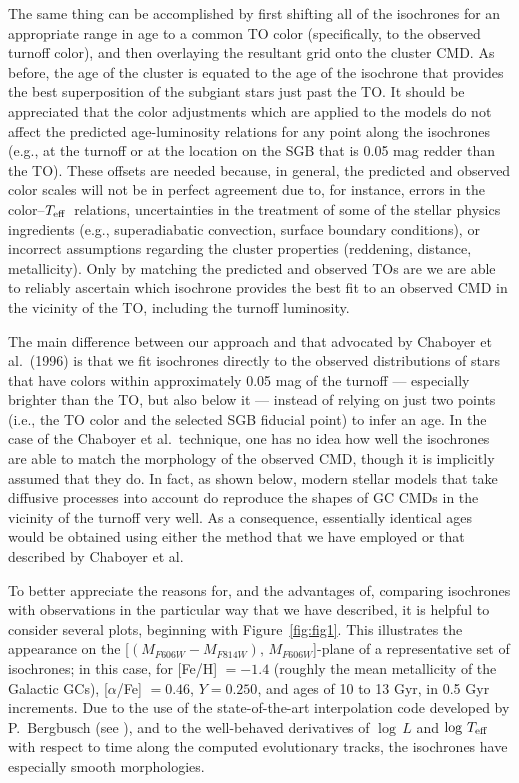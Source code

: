 \documentclass[12pt,preprint]{aastex}
\newcommand\teff{{T_{\rm eff}}}
\begin{document}
The same thing can be accomplished by first shifting all of the isochrones for
an appropriate range in age to a common TO color (specifically, to the observed
turnoff color), and then overlaying the resultant grid onto the cluster CMD.
As before, the age of the cluster is equated to the age of the isochrone that
provides the best superposition of the subgiant stars just past the TO.   It
should be appreciated that the color adjustments which are applied to the models
do not affect the predicted age-luminosity relations for any point along the
isochrones (e.g., at the turnoff or at the location on the SGB that is 0.05 mag
redder than the TO).  These offsets are needed because, in general, the 
predicted and observed color scales will not be in perfect agreement due to,
for instance, errors in the color--$\teff$\ relations, uncertainties in the
treatment of some of the stellar physics ingredients (e.g., superadiabatic
convection, surface boundary conditions), or incorrect assumptions regarding
the cluster properties (reddening, distance, metallicity).  Only by matching the
predicted and observed TOs are we are able to reliably ascertain which isochrone
provides the best fit to an observed CMD in the vicinity of the TO, including
the turnoff luminosity.

The main difference between our approach and that advocated by Chaboyer et
al.~(1996) is that we fit isochrones directly to the observed distributions of
stars that have colors within approximately 0.05 mag of the turnoff ---
especially brighter than the TO, but also below it --- instead of relying on
just two points (i.e., the TO color and the selected SGB fiducial point) to 
infer an age.  In the case of the Chaboyer et al.~technique, one has no idea
how well the isochrones are able to match the morphology of the observed CMD,
though it is implicitly assumed that they do.  In fact, as shown below, modern
stellar models that take diffusive processes into account do reproduce the
shapes of GC CMDs in the vicinity of the turnoff very well.  As a consequence,
essentially identical ages would be obtained using either the method that we
have employed or that described by Chaboyer et al.

To better appreciate the reasons for, and the advantages of, comparing
isochrones with observations in the particular way that we have described, it
is helpful to consider several plots, beginning with Figure~\ref{fig:fig1}.
This illustrates the appearance on the [$(M_{F606W} -
M_{F814W}),\,M_{F606W}$]-plane of a representative set of isochrones; in this
case, for [Fe/H] $= -1.4$ (roughly the mean metallicity of the Galactic GCs),
[$\alpha$/Fe] $= 0.46$, $Y = 0.250$, and ages of 10 to 13 Gyr, in 0.5 Gyr
increments.  Due to the use of the state-of-the-art interpolation code developed
by P.~Bergbusch (see \citealt[][and references therein, as well as
the latest updates reported by VBD12]{bv01}), and to the well-behaved
derivatives of $\log\,L$ and $\log\,T_{\rm eff}$ with respect to time along the
computed evolutionary tracks, the isochrones have especially smooth
morphologies.
\end{document}
